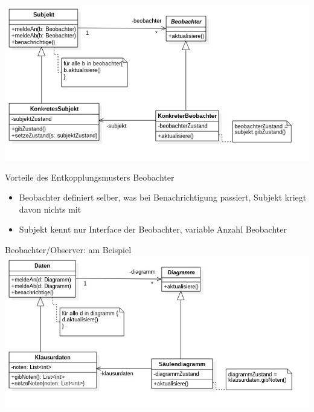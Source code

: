 \documentclass[18pt]{beamer}
\begin{document}
		\begin{frame}{}
			\includegraphics[keepaspectratio, width=\textwidth, height=\textheight]{diagrams/interview/observer.jpg}
			\pause
			\begin{block}{Vorteile des Entkopplungsmusters Beobachter}
				\begin{itemize}
					\item Beobachter definiert selber, was bei Benachrichtigung passiert, Subjekt kriegt davon nichts mit
					\item Subjekt kennt nur Interface der Beobachter, variable Anzahl Beobachter
				\end{itemize}
			\end{block}
		\end{frame}

		\begin{frame}{Beobachter/Observer: am Beispiel}
			\includegraphics[keepaspectratio, width=\textwidth, height=\textheight]{diagrams/interview/observer_example.jpg}
			

\end{frame}
\end{document}
